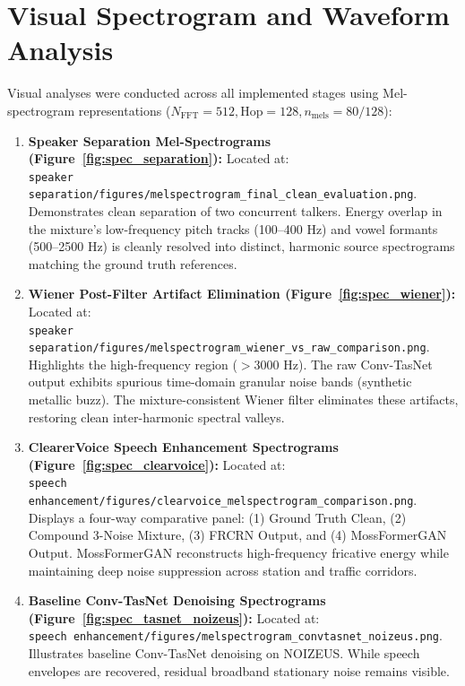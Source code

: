 \documentclass[11pt,a4paper]{report}
\begin{document}
\section{Visual Spectrogram and Waveform Analysis}
Visual analyses were conducted across all implemented stages using Mel-spectrogram representations ($N_{\text{FFT}}=512, \text{Hop}=128, n_{\text{mels}}=80/128$):
\begin{enumerate}
    \item \textbf{Speaker Separation Mel-Spectrograms (Figure~\ref{fig:spec_separation}):} Located at: \\
    \texttt{speaker separation/figures/melspectrogram\_final\_clean\_evaluation.png}. \\
    Demonstrates clean separation of two concurrent talkers. Energy overlap in the mixture's low-frequency pitch tracks (100--400 Hz) and vowel formants (500--2500 Hz) is cleanly resolved into distinct, harmonic source spectrograms matching the ground truth references.
    \item \textbf{Wiener Post-Filter Artifact Elimination (Figure~\ref{fig:spec_wiener}):} Located at: \\
    \texttt{speaker separation/figures/melspectrogram\_wiener\_vs\_raw\_comparison.png}. \\
    Highlights the high-frequency region ($>3000\text{ Hz}$). The raw Conv-TasNet output exhibits spurious time-domain granular noise bands (synthetic metallic buzz). The mixture-consistent Wiener filter eliminates these artifacts, restoring clean inter-harmonic spectral valleys.
    \item \textbf{ClearerVoice Speech Enhancement Spectrograms (Figure~\ref{fig:spec_clearvoice}):} Located at: \\
    \texttt{speech enhancement/figures/clearvoice\_melspectrogram\_comparison.png}. \\
    Displays a four-way comparative panel: (1) Ground Truth Clean, (2) Compound 3-Noise Mixture, (3) FRCRN Output, and (4) MossFormerGAN Output. MossFormerGAN reconstructs high-frequency fricative energy while maintaining deep noise suppression across station and traffic corridors.
    \item \textbf{Baseline Conv-TasNet Denoising Spectrograms (Figure~\ref{fig:spec_tasnet_noizeus}):} Located at: \\
    \texttt{speech enhancement/figures/melspectrogram\_convtasnet\_noizeus.png}. \\
    Illustrates baseline Conv-TasNet denoising on NOIZEUS. While speech envelopes are recovered, residual broadband stationary noise remains visible.
\end{enumerate}
\end{document}
